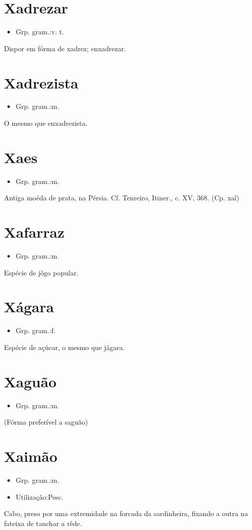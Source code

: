 \section{Xadrezar}
\begin{itemize}
\item {Grp. gram.:v. t.}
\end{itemize}
Dispor em fórma de xadrez; enxadrezar.
\section{Xadrezista}
\begin{itemize}
\item {Grp. gram.:m.}
\end{itemize}
O mesmo que \textunderscore enxadrezista\textunderscore .
\section{Xaes}
\begin{itemize}
\item {Grp. gram.:m.}
\end{itemize}
Antiga moéda de prata, na Pérsia. Cf. Tenreiro, \textunderscore Itiner.\textunderscore , c. XV, 368.
(Cp. \textunderscore xal\textunderscore )
\section{Xafarraz}
\begin{itemize}
\item {Grp. gram.:m.}
\end{itemize}
Espécie de jôgo popular.
\section{Xágara}
\begin{itemize}
\item {Grp. gram.:f.}
\end{itemize}
Espécie de açúcar, o mesmo que \textunderscore jágara\textunderscore .
\section{Xaguão}
\begin{itemize}
\item {Grp. gram.:m.}
\end{itemize}
(Fórma preferível a \textunderscore saguão\textunderscore )
\section{Xaimão}
\begin{itemize}
\item {Grp. gram.:m.}
\end{itemize}
\begin{itemize}
\item {Utilização:Pesc.}
\end{itemize}
Cabo, preso por uma extremidade na forcada da sardinheira, fixando a outra na fateixa de tanchar a rêde.
